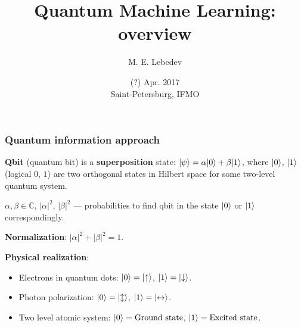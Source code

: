 \documentclass{beamer}
\DeclarePairedDelimiter\ket{\lvert}{\rangle}
\begin{document}
\title{Quantum Machine Learning: overview}
\author{M. E. Lebedev}
\date{(?) Apr. 2017 \\ Saint-Petersburg, IFMO}

\begin{frame}
\maketitle
\end{frame}

\begin{frame}
\frametitle{Quantum information approach}

{\bf Qbit} (quantum bit) is a {\bf superposition} state: $\ket{\psi} = \alpha \ket{0} + \beta \ket{1}$,
where $\ket{0}$, $\ket{1}$ (logical $0$, $1$) are two orthogonal states in Hilbert space for some two-level quantum system.

\medskip

$\alpha, \beta \in \mathbb{C}$, $|\alpha|^2$, $|\beta|^2$ --- probabilities to find qbit in the state $\ket{0}$ or $\ket{1}$ correspondingly.

\medskip

{\bf Normalization}: $|\alpha|^2 + |\beta|^2 = 1$.

\medskip

{\bf Physical realization}:
\begin{itemize}
\item Electrons in quantum dots: $\ket{0} = \ket{\uparrow}$, $\ket{1} = \ket{\downarrow}$.
\item Photon polarization: $\ket{0} = \ket{\updownarrow}$, $\ket{1} = \ket{\leftrightarrow}$.
\item Two level atomic system: $\ket{0} = \textrm{Ground state}$, $\ket{1} = \textrm{Excited state}$.
\end{itemize}

\end{frame}
\end{document}
